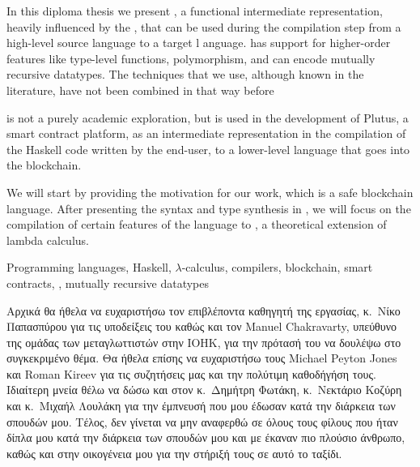 \documentclass[diploma]{softlab-thesis}
\begin{document}

\begin{abstracten}%
In this diploma thesis we present \FIR{}, a functional intermediate representation, heavily influenced
by the \FOM{}, that can be used during the compilation step from a high-level source language to a target l
anguage. \FIR{} has support for higher-order features like type-level functions, polymorphism, and can encode
mutually recursive datatypes. The techniques that we use, although known in the literature, have
not been combined in that way before

\FIR{} is not a purely academic exploration, but is used in the development of Plutus, a smart contract
platform, as an intermediate representation in the compilation of the Haskell code written by the end-user,
to a lower-level language that goes into the blockchain.

We will start by providing the motivation for our work, which is a safe blockchain language. After presenting the syntax and type synthesis in \FIR{}, we will focus on the compilation of certain features
of the language to \FOMF, a theoretical extension of lambda calculus.

\begin{keywordsen}
Programming languages, Haskell, $\lambda$-calculus, compilers, blockchain, smart contracts, \FOM{},
mutually recursive datatypes
\end{keywordsen}
\end{abstracten}


\begin{acknowledgementsgr}
Αρχικά θα ήθελα να ευχαριστήσω τον επιβλέποντα καθηγητή της εργασίας, κ.\ Νίκο Παπασπύρου για τις υποδείξεις του καθώς και τον Manuel Chakravarty, υπεύθυνο της ομάδας των μεταγλωττιστών στην IOHK, για την πρότασή του να δουλέψω στο συγκεκριμένο θέμα. Θα ήθελα επίσης να ευχαριστήσω τους Michael Peyton Jones και Roman Kireev για τις συζητήσεις μας και την πολύτιμη καθοδήγήση τους. Ιδιαίτερη μνεία
θέλω να δώσω και στον κ.\ Δημήτρη Φωτάκη, κ.\ Νεκτάριο Κοζύρη και κ.\ Μιχαήλ Λουλάκη για την έμπνευσή
που μου έδωσαν κατά την διάρκεια των σπουδών μου.
Τέλος, δεν γίνεται να μην αναφερθώ σε όλους τους φίλους που ήταν δίπλα μου κατά την διάρκεια των σπουδών μου και με έκαναν πιο πλούσιο άνθρωπο, καθώς και στην οικογένεια μου για την στήριξή τους σε αυτό το ταξίδι.
\end{acknowledgementsgr}


\end{document}
